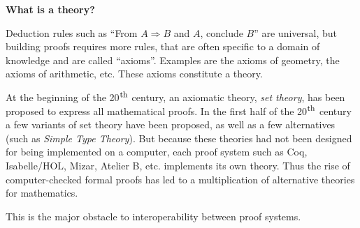 \begin{shaded}
\vspace*{-0.5cm}
  \begin{center}
{\bf \Large What is a theory?}
\end{center}

Deduction rules such as ``From $A \Rightarrow B$ and $A$, conclude
$B$'' are universal, but building proofs requires more rules, that are
often specific to a domain of knowledge and are called
``axioms''. Examples are the axioms of geometry, the axioms of
arithmetic, etc. These axioms constitute a theory.

At the beginning of the 20$^{\mbox{\footnotesize th}}$ century, an
axiomatic theory, {\em set theory}, has been proposed to express all
mathematical proofs. In the first half of the 20$^{\mbox{\footnotesize
    th}}$ century a few variants of set theory have been proposed, as
well as a few alternatives (such as \emph{Simple Type Theory}).  But
because these theories had not been designed for being implemented on
a computer, each proof system such as Coq, Isabelle/HOL, Mizar,
Atelier B, etc. implements its own theory.  Thus the rise of
computer-checked formal proofs has led to a multiplication of
alternative theories for mathematics.

This is the major obstacle to interoperability between proof systems.
\end{shaded}

